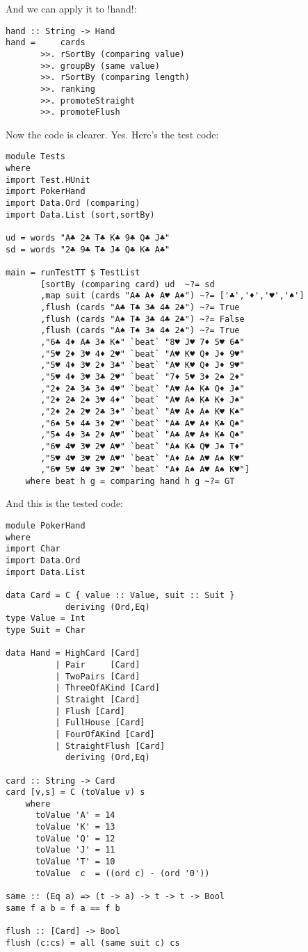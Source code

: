 \lhA \success And we can apply it to \il!hand!:
\begin{lstlisting}[frame=single]
hand :: String -> Hand
hand =     cards
       >>. rSortBy (comparing value)
       >>. groupBy (same value)
       >>. rSortBy (comparing length)
       >>. ranking 
       >>. promoteStraight
       >>. promoteFlush    
\end{lstlisting}
\success Now the code is clearer.
\lhN Yes. Here's the test code:
\begin{lstlisting}[frame=single]
module Tests
where 
import Test.HUnit
import PokerHand
import Data.Ord (comparing)
import Data.List (sort,sortBy)

ud = words "A♣ 2♣ T♣ K♣ 9♣ Q♣ J♣"
sd = words "2♣ 9♣ T♣ J♣ Q♣ K♣ A♣"

main = runTestTT $ TestList 
       [sortBy (comparing card) ud  ~?= sd
       ,map suit (cards "A♣ A♦ A♥ A♠") ~?= ['♣','♦','♥','♠']
       ,flush (cards "A♣ T♣ 3♣ 4♣ 2♣") ~?= True
       ,flush (cards "A♠ T♣ 3♣ 4♣ 2♣") ~?= False
       ,flush (cards "A♠ T♠ 3♠ 4♠ 2♠") ~?= True
       ,"6♣ 4♦ A♣ 3♠ K♠" `beat` "8♥ J♥ 7♦ 5♥ 6♣"
       ,"5♥ 2♦ 3♥ 4♦ 2♥" `beat` "A♥ K♥ Q♦ J♦ 9♥"
       ,"5♥ 4♦ 3♥ 2♦ 3♣" `beat` "A♥ K♥ Q♦ J♦ 9♥"
       ,"5♥ 4♦ 3♥ 3♣ 2♥" `beat` "7♦ 5♥ 3♦ 2♠ 2♦"
       ,"2♦ 2♣ 3♣ 3♠ 4♥" `beat` "A♥ A♠ K♣ Q♦ J♠"  
       ,"2♦ 2♣ 2♠ 3♥ 4♦" `beat` "A♥ A♠ K♣ K♦ J♠"
       ,"2♦ 2♠ 2♥ 2♣ 3♦" `beat` "A♥ A♦ A♠ K♥ K♠"
       ,"6♠ 5♦ 4♣ 3♦ 2♥" `beat` "A♣ A♥ A♦ K♣ Q♠"
       ,"5♠ 4♦ 3♣ 2♦ A♥" `beat` "A♣ A♥ A♦ K♣ Q♠"
       ,"6♥ 4♥ 3♥ 2♥ A♥" `beat` "A♠ K♣ Q♥ J♠ T♦"
       ,"5♥ 4♥ 3♥ 2♥ A♥" `beat` "A♦ A♠ A♥ A♠ K♥"
       ,"6♥ 5♥ 4♥ 3♥ 2♥" `beat` "A♦ A♠ A♥ A♠ K♥"]
    where beat h g = comparing hand h g ~?= GT
\end{lstlisting} %
\lhA And this is the tested code:
\begin{lstlisting}[frame=single]
module PokerHand
where
import Char
import Data.Ord
import Data.List

data Card = C { value :: Value, suit :: Suit } 
            deriving (Ord,Eq)
type Value = Int
type Suit = Char

data Hand = HighCard [Card]
          | Pair     [Card]
          | TwoPairs [Card]
          | ThreeOfAKind [Card]
          | Straight [Card]
          | Flush [Card]
          | FullHouse [Card]
          | FourOfAKind [Card]
          | StraightFlush [Card]
            deriving (Ord,Eq)

card :: String -> Card
card [v,s] = C (toValue v) s
    where 
      toValue 'A' = 14
      toValue 'K' = 13
      toValue 'Q' = 12
      toValue 'J' = 11
      toValue 'T' = 10
      toValue  c  = ((ord c) - (ord '0'))

same :: (Eq a) => (t -> a) -> t -> t -> Bool
same f a b = f a == f b

flush :: [Card] -> Bool
flush (c:cs) = all (same suit c) cs
\end{lstlisting}

